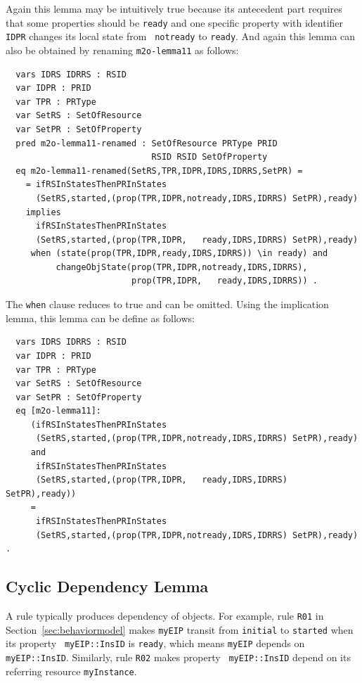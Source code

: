 \documentclass[12pt]{report}
\begin{document}
\normalsize
Again this lemma may be intuitively true because its antecedent part
requires that some properties should be {\tt ready} and one specific
property with identifier {\tt IDPR} changes its local state from {\tt
  notready} to {\tt ready}. And again this lemma can also be obtained by
renaming {\tt m2o-lemma11} as follows:
\small
\begin{verbatim}
  vars IDRS IDRRS : RSID 
  var IDPR : PRID
  var TPR : PRType
  var SetRS : SetOfResource
  var SetPR : SetOfProperty
  pred m2o-lemma11-renamed : SetOfResource PRType PRID 
                             RSID RSID SetOfProperty
  eq m2o-lemma11-renamed(SetRS,TPR,IDPR,IDRS,IDRRS,SetPR) =
    = ifRSInStatesThenPRInStates
      (SetRS,started,(prop(TPR,IDPR,notready,IDRS,IDRRS) SetPR),ready)
    implies
      ifRSInStatesThenPRInStates
      (SetRS,started,(prop(TPR,IDPR,   ready,IDRS,IDRRS) SetPR),ready)
     when (state(prop(TPR,IDPR,ready,IDRS,IDRRS)) \in ready) and 
          changeObjState(prop(TPR,IDPR,notready,IDRS,IDRRS),
                         prop(TPR,IDPR,   ready,IDRS,IDRRS)) .
\end{verbatim}
\normalsize
The {\tt when} clause reduces to true and can be omitted. Using the
implication lemma, this lemma can be define as follows:
\small
\begin{verbatim}
  vars IDRS IDRRS : RSID 
  var IDPR : PRID
  var TPR : PRType
  var SetRS : SetOfResource
  var SetPR : SetOfProperty
  eq [m2o-lemma11]:
     (ifRSInStatesThenPRInStates
      (SetRS,started,(prop(TPR,IDPR,notready,IDRS,IDRRS) SetPR),ready)
     and
      ifRSInStatesThenPRInStates
      (SetRS,started,(prop(TPR,IDPR,   ready,IDRS,IDRRS) SetPR),ready))
     = 
      ifRSInStatesThenPRInStates
      (SetRS,started,(prop(TPR,IDPR,notready,IDRS,IDRRS) SetPR),ready) .
\end{verbatim}
\normalsize

\subsection{Cyclic Dependency Lemma}
\label{sec:cyclelemma}
A rule typically produces dependency of objects.  For example, rule
{\tt R01} in Section~\ref{sec:behaviormodel} makes {\tt myEIP} transit
from {\tt initial} to {\tt started} when its property {\tt
  myEIP::InsID} is {\tt ready}, which means {\tt myEIP} depends on
{\tt myEIP::InsID}.  Similarly, rule {\tt R02} makes property {\tt
  myEIP::InsID} depend on its referring resource {\tt myInstance}.
\end{document}
